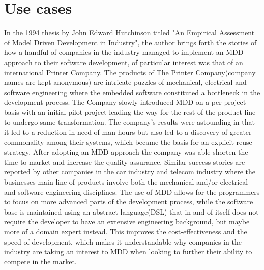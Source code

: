 \section{Use cases}
\label{Use cases}
In the 1994 thesis by John Edward Hutchinson titled "An Empirical Assessment of Model Driven Development in Industry", the author brings forth the stories of how a handful of companies in the industry managed to implement an MDD approach to their software development, of particular interest was that of an international Printer Company.
The products of The Printer Company(company names are kept anonymous) are intricate puzzles of mechanical, electrical and software engineering where the embedded software constituted a bottleneck in the development process. The Company slowly introduced MDD on a per project basis with an initial pilot project leading the way for the rest of the product line to undergo same transformation. 
The company's results were astounding in that it led to a reduction in need of man hours but also led to a discovery of greater commonality among their systems, which became the basis for an explicit reuse strategy. After adopting an MDD approach the company was able shorten the time to market and increase the quality assurance.
Similar success stories are reported by other companies in the car industry and telecom industry where the businesses main line of products involve both the mechanical and/or electrical and software engineering disciplines. The use of MDD allows for the programmers to focus on more advanced parts of the development process, while the software base is maintained using an abstract language(DSL) that in and of itself does not require the developer to have an extensive engineering background, but maybe more of a domain expert instead.
This improves the cost-effectiveness and the speed of development, which makes it understandable why companies in the industry are taking an interest to MDD when looking to further their ability to compete in the market.
